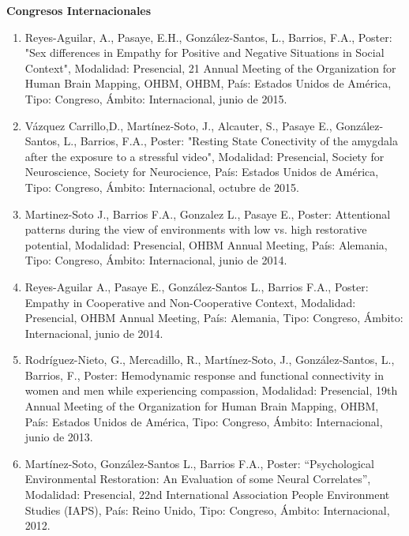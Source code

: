 \textbf{Congresos Internacionales}

\hfill

\begin{enumerate}

\item Reyes-Aguilar, A., Pasaye, E.H., González-Santos, L., Barrios, F.A., Poster: "Sex differences in Empathy for Positive 
and Negative Situations in Social Context", Modalidad: Presencial, 21 Annual Meeting of the Organization for Human Brain 
Mapping, OHBM, OHBM, País: Estados Unidos de América, Tipo: Congreso, Ámbito: Internacional, junio de 2015.

\item Vázquez Carrillo,D., Martínez-Soto, J., Alcauter, S., Pasaye E., González-Santos, L., Barrios, F.A., Poster: "Resting 
State Conectivity of the amygdala after the exposure to a stressful video", Modalidad: Presencial, Society for 
Neuroscience, Society for Neurocience, País: Estados Unidos de América, Tipo: Congreso, Ámbito: Internacional, octubre de 
2015.

\item Martinez-Soto J., Barrios F.A., Gonzalez L., Pasaye E., Poster: Attentional patterns during the view of environments with low vs. high 
restorative potential, Modalidad: Presencial, OHBM Annual Meeting, País: 
Alemania, Tipo: Congreso, Ámbito: Internacional, junio de 2014.

\item Reyes-Aguilar A., Pasaye E., González-Santos L., Barrios F.A., Poster: Empathy in Cooperative and Non-Cooperative 
Context, Modalidad: Presencial, OHBM Annual Meeting, País: Alemania, Tipo: Congreso, Ámbito: Internacional, junio de 2014.

\item Rodríguez-Nieto, G., Mercadillo, R., Martínez-Soto, J., González-Santos, L., Barrios, F., Poster: Hemodynamic response 
and functional connectivity in women and men while experiencing compassion, Modalidad: Presencial, 19th Annual Meeting of 
the Organization for Human Brain Mapping, OHBM, País: Estados Unidos de América, Tipo: Congreso, Ámbito: Internacional, 
junio de 2013.

\item Martínez-Soto, González-Santos L., Barrios F.A., Poster: “Psychological Environmental Restoration: An Evaluation of some 
Neural Correlates”, Modalidad: Presencial, 22nd International Association People Environment Studies (IAPS), País: Reino 
Unido, Tipo: Congreso, Ámbito: Internacional, 2012.


\end{enumerate}

